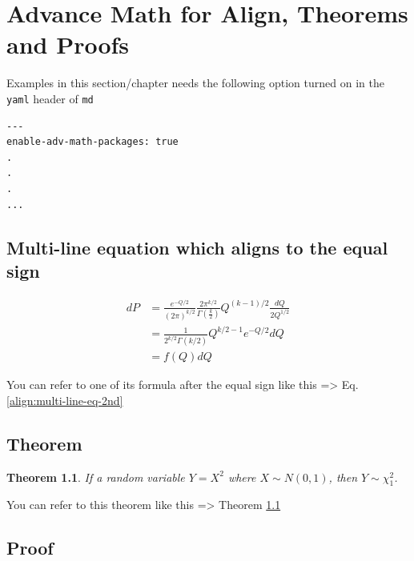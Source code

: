 \documentclass[10pt, a4paper, oneside]{book}
\newtheorem{theorem}{Theorem} %
\begin{document}
\chapter{Advance Math for Align, Theorems and Proofs}\label{advance-math-for-align-theorems-and-proofs}

Examples in this section/chapter needs
the following option turned on in the \texttt{yaml} header of \texttt{md}

\begin{verbatim}
---
enable-adv-math-packages: true
.
.
.
...
\end{verbatim}

\section{Multi-line equation which aligns to the equal sign}\label{multi-line-equation-which-aligns-to-the-equal-sign}

\begin{align}
dP &= \frac{e^{-Q/2}}{(2\pi)^{k/2}}\frac{2\pi^{k/2}}{\Gamma(\frac{k}{2})}Q^{(k-1)/2}\frac{dQ}{2Q^{1/2}} \nonumber \\
   &= \frac{1}{2^{k/2}\Gamma(k/2)}Q^{k/2 - 1}e^{-Q/2}dQ \label{align:multi-line-eq-2nd} \\
   &= f(Q)dQ \label{align:multi-line-eq-3rd}
\end{align}

You can refer to one of its formula after the equal sign like this =\textgreater{} Eq. \ref{align:multi-line-eq-2nd}

\section{Theorem}\label{theorem}

\begin{theorem}\label{thm:X-2-chi}
If a random variable $Y = X^{2}$ where $X \sim N(0,1)$,
then $Y  \sim \chi^{2}_{1}$.
\end{theorem}

You can refer to this theorem like this =\textgreater{} Theorem \ref{thm:X-2-chi}

\section{Proof}\label{proof}
\end{document}
